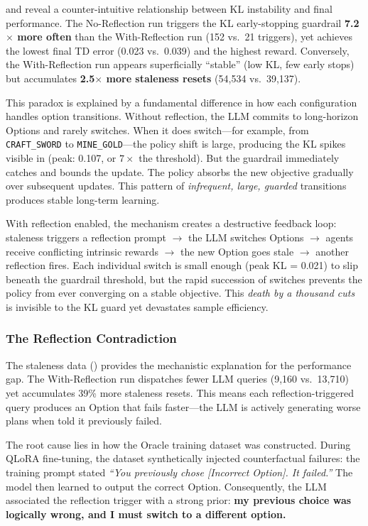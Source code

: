  and  reveal a counter-intuitive relationship between KL instability and final performance. The No-Reflection run triggers the KL early-stopping guardrail \textbf{7.2$\times$ more often} than the With-Reflection run (152 vs.\ 21 triggers), yet achieves the lowest final TD error (0.023 vs.\ 0.039) and the highest reward. Conversely, the With-Reflection run appears superficially ``stable'' (low KL, few early stops) but accumulates \textbf{2.5$\times$ more staleness resets} (54{,}534 vs.\ 39{,}137).

This paradox is explained by a fundamental difference in how each configuration handles option transitions. Without reflection, the LLM commits to long-horizon Options and rarely switches. When it does switch---for example, from \texttt{CRAFT\_SWORD} to \texttt{MINE\_GOLD}---the policy shift is large, producing the KL spikes visible in  (peak: 0.107, or $7\times$ the threshold). But the guardrail immediately catches and bounds the update. The policy absorbs the new objective gradually over subsequent updates. This pattern of \emph{infrequent, large, guarded} transitions produces stable long-term learning.

With reflection enabled, the mechanism creates a destructive feedback loop: staleness triggers a reflection prompt $\rightarrow$ the LLM switches Options $\rightarrow$ agents receive conflicting intrinsic rewards $\rightarrow$ the new Option goes stale $\rightarrow$ another reflection fires. Each individual switch is small enough (peak KL = 0.021) to slip beneath the guardrail threshold, but the rapid succession of switches prevents the policy from ever converging on a stable objective. This \emph{death by a thousand cuts} is invisible to the KL guard yet devastates sample efficiency.

\subsubsection{The Reflection Contradiction}
\label{sec:reflection_ablation}

The staleness data () provides the mechanistic explanation for the performance gap. The With-Reflection run dispatches fewer LLM queries (9{,}160 vs.\ 13{,}710) yet accumulates 39\% more staleness resets. This means each reflection-triggered query produces an Option that fails faster---the LLM is actively generating worse plans when told it previously failed.

The root cause lies in how the Oracle training dataset was constructed. During QLoRA fine-tuning, the dataset synthetically injected counterfactual failures: the training prompt stated \emph{``You previously chose [Incorrect Option]. It failed.''} The model then learned to output the correct Option. Consequently, the LLM associated the reflection trigger with a strong prior: \textbf{my previous choice was logically wrong, and I must switch to a different option.}

